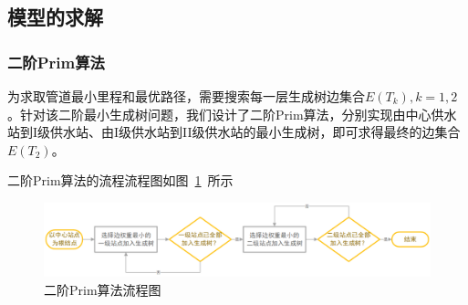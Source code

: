 \documentclass{whutmod}
\begin{document}
		\subsection{模型的求解}
			\subsubsection{二阶Prim算法}
		为求取管道最小里程和最优路径，需要搜索每一层生成树边集合$E(T_k),k=1,2$。针对该二阶最小生成树问题，我们设计了二阶Prim算法，分别实现由中心供水站到I级供水站、由I级供水站到II级供水站的最小生成树，即可求得最终的边集合$E(T_2)$。
		
		二阶Prim算法的流程流程图如图~\ref{awwwsd}~所示
		\begin{figure}[H]
		\centering
		\includegraphics[width=\textwidth]{figures/a1.png}
		\caption{二阶Prim算法流程图}\label{awwwsd}
	\end{figure}
		
\end{document}
